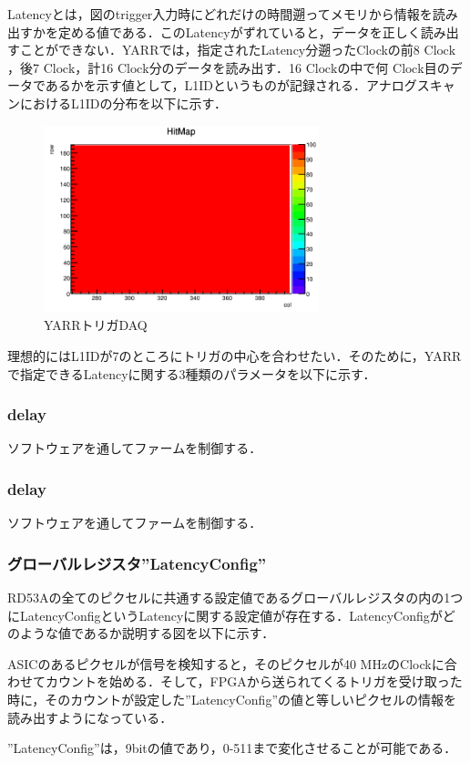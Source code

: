 Latencyとは，図のtrigger入力時にどれだけの時間遡ってメモリから情報を読み出すかを定める値である．このLatencyがずれていると，データを正しく読み出すことができない．YARRでは，指定されたLatency分遡ったClockの前8 $\mathrm{Clock}$，後7 $\mathrm{Clock}$，計16 $\mathrm{Clock}$分のデータを読み出す．16 $\mathrm{Clock}$の中で何 $\mathrm{Clock}$目のデータであるかを示す値として，L1IDというものが記録される．アナログスキャンにおけるL1IDの分布を以下に示す．\par
\begin{figure}[h]
  \centering
  \includegraphics[width=8cm]{./figure/DigitalScan.png}
  \caption{YARRトリガDAQ}
  \label{fig:YARRDAQ}
\end{figure}


理想的にはL1IDが7のところにトリガの中心を合わせたい．そのために，YARRで指定できるLatencyに関する3種類のパラメータを以下に示す．
\subsubsection*{delay}
ソフトウェアを通してファームを制御する．
\subsubsection*{delay}
ソフトウェアを通してファームを制御する．
\subsubsection*{グローバルレジスタ''LatencyConfig''}
RD53Aの全てのピクセルに共通する設定値であるグローバルレジスタの内の1つにLatencyConfigというLatencyに関する設定値が存在する．LatencyConfigがどのような値であるか説明する図を以下に示す．\par
ASICのあるピクセルが信号を検知すると，そのピクセルが40 $\mathrm{MHz}$のClockに合わせてカウントを始める．そして，FPGAから送られてくるトリガを受け取った時に，そのカウントが設定した''LatencyConfig''の値と等しいピクセルの情報を読み出すようになっている．\par
''LatencyConfig''は，9bitの値であり，0-511まで変化させることが可能である．

